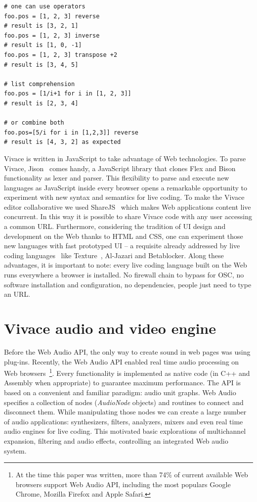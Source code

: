 \documentclass[12pt,times,twocolumn]{article}
\begin{document}
\begin{Verbatim}[fontfamily=courier, xleftmargin=\parindent,fontsize=\footnotesize]
# one can use operators
foo.pos = [1, 2, 3] reverse
# result is [3, 2, 1]
foo.pos = [1, 2, 3] inverse 
# result is [1, 0, -1]
foo.pos = [1, 2, 3] transpose +2   
# result is [3, 4, 5]

# list comprehension
foo.pos = [1/i+1 for i in [1, 2, 3]] 
# result is [2, 3, 4]

# or combine both
foo.pos=[5/i for i in [1,2,3]] reverse 
# result is [4, 3, 2] as expected
\end{Verbatim}

Vivace is written in JavaScript to take advantage of Web technologies.
To parse Vivace, Jison~\cite{jison} comes handy, a JavaScript
library that clones Flex and Bison functionality as lexer and
parser. This flexibility to parse and execute new languages as
JavaScript inside every browser opens a remarkable opportunity to
experiment with new syntax and semantics for live coding. To make the
Vivace editor collaborative we used ShareJS~\cite{sharejs} which makes
Web applications content live concurrent. In this way it is possible
to share Vivace code with any user accessing a common
URL. Furthermore, considering the tradition of UI design and
development on the Web thanks to HTML and CSS, one can experiment
those new languages with fast prototyped UI -- a requisite already
addressed by live coding languages~\cite{mclean2010visualisation,
  magnusson2011algorithms} like Texture~\cite{mclean2011texture},
Al-Jazari and Betablocker. Along these advantages, it is important to
note: every live coding language built on the Web runs everywhere a
browser is installed. No firewall chain to bypass for OSC, no software
installation and configuration, no dependencies, people just need to
type an URL.

\section{Vivace audio and video engine}
Before the Web Audio API, the only way to create sound in web pages
was using plug-ins. Recently, the Web Audio API enabled real time
audio processing on Web browsers~\footnote{At the time this paper was
  written, more than 74\% of current available Web browsers support Web Audio
  API\cite{caniuse}, including the most populars Google Chrome, Mozilla Firefox and Apple
  Safari.}. Every functionality is implemented as native code (in C++
and Assembly when appropriate) to guarantee maximum performance. The
API is based on a convenient and familiar paradigm: audio unit
graphs. Web Audio specifies a collection of nodes (\emph{AudioNode}
objects) and routines to connect and disconnect them. While
manipulating those nodes we can create a large number of audio
applications: synthesizers, filters, analyzers, mixers and even real
time audio engines for live coding. This motivated basic explorations
of multichannel expansion, filtering and audio effects, controlling an
integrated Web audio system.
\end{document}
